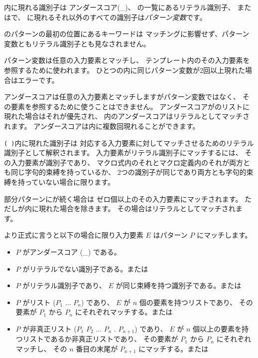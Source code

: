 \begin{entry}
内に現れる識別子は
アンダースコア({\cf \_})、
の一覧にあるリテラル識別子、
またはで、
に現れるそれ以外のすべての識別子は{\em パターン変数}です。

のパターンの最初の位置にあるキーワードは
マッチングに影響せず、パターン変数ともリテラル識別子とも見なされません。

パターン変数は任意の入力要素とマッチし、
テンプレート内のその入力要素を参照するために使われます。
ひとつの内に同じパターン変数が2回以上現れた場合はエラーです。

アンダースコアは任意の入力要素とマッチしますがパターン変数ではなく、
その要素を参照するために使うことはできません。
アンダースコアがのリストに現れた場合はそれが優先され、
内のアンダースコアはリテラルとしてマッチされます。
アンダースコアは内に複数回現れることができます。

\texttt{( \dotsfoo)}内に現れた識別子は
対応する入力要素に対してマッチさせるためのリテラル識別子として解釈されます。
入力要素がリテラル識別子にマッチするには、
その入力要素が識別子であり、
マクロ式内のそれとマクロ定義内のそれが両方とも同じ字句的束縛を持っているか、
2つの識別子が同じであり両方とも字句的束縛を持っていない場合に限ります。

部分パターンにが続く場合は
ゼロ個以上のその入力要素にマッチされます。
ただしが内に現れた場合を除きます。
その場合はリテラルとしてマッチされます。

より正式に言うと以下の場合に限り入力要素 $E$ はパターン $P$ にマッチします。

\begin{itemize}
\item $P$ がアンダースコア ({\cf \_}) である。

\item $P$ がリテラルでない識別子である。または

\item $P$ がリテラル識別子であり、 $E$ が同じ束縛を持つ識別子である。または

\item $P$ がリスト {\cf ($P_1$ $\dots$ $P_n$)} であり、 $E$ が $n$ 個の要素を持つリストであり、
      その要素が $P_1$ から $P_n$ にそれぞれマッチする。または

\item $P$ が非真正リスト
      {\cf ($P_1$ $P_2$ $\dots$ $P_n$ . $P_{n+1}$)}
      であり、 $E$ が $n$ 個以上の要素を持つリストであるか非真正リストであり、
      その要素が $P_1$ から $P_n$ にそれぞれマッチし、
      その $n$ 番目の末尾が $P_{n+1}$ にマッチする。または


\end{itemize}
\end{entry}
